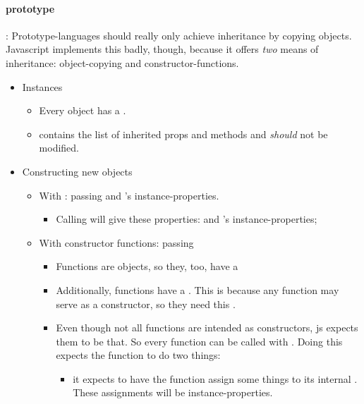 \paragraph{prototype}: Prototype-languages should really only achieve inheritance by copying objects. Javascript implements this badly, though, because it offers \emph{two} means of inheritance: object-copying and constructor-functions.
\begin{itemize}
    \item Instances 
        \begin{itemize}
            \item Every object has a . 
            \item {} contains the list of inherited props and methods and \emph{should} not be modified.
        \end{itemize}
    \item Constructing new objects
        \begin{itemize}
            \item With : passing  and 's instance-properties.
                \begin{itemize}
                    \item Calling  will give  these properties:  and 's instance-properties;
                \end{itemize}
            \item With constructor functions: passing 
                \begin{itemize}
                    \item Functions are objects, so they, too, have a 
                    \item Additionally, functions have a . This is because any function may serve as a constructor, so they need this .
                    \item Even though not all functions are intended as constructors, js expects them to be that. So every function can be called with . Doing this expects the function to do two things:
                        \begin{itemize}
                            \item it expects to have the function assign some things to its internal . These assignments will be instance-properties.

\end{itemize}
\end{itemize}
\end{itemize}
\end{itemize}
